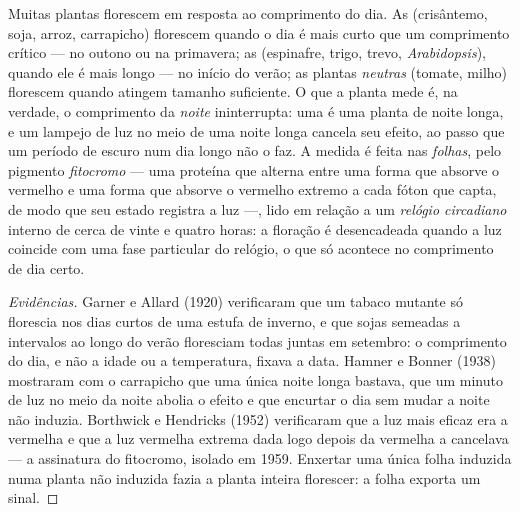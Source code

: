 \begin{proposition}\label{prop:b2:plant-flowering:photoperiod}
Muitas plantas florescem em resposta ao comprimento do dia. As
\emph{} (crisântemo, soja, arroz, carrapicho)
florescem quando o dia é mais curto que um comprimento crítico --- no
outono ou na primavera; as \emph{} (espinafre,
trigo, trevo, \emph{Arabidopsis}), quando ele é mais longo --- no início
do verão; as plantas \emph{neutras} (tomate, milho) florescem quando
atingem tamanho suficiente. O que a planta mede é, na verdade, o
comprimento da \emph{noite} ininterrupta: uma  é uma
planta de noite longa, e um lampejo de luz no meio de uma noite longa
cancela seu efeito, ao passo que um período de escuro num dia longo
não o faz. A medida é feita nas \emph{folhas}, pelo pigmento
\emph{fitocromo} --- uma proteína que alterna entre uma forma que
absorve o vermelho e uma forma que absorve o vermelho extremo a cada
fóton que capta, de modo que seu estado registra a luz ---, lido em
relação a um \emph{relógio circadiano} interno de cerca de vinte e
quatro horas: a floração é desencadeada quando a luz coincide com uma
fase particular do relógio, o que só acontece no comprimento de dia
certo.
\end{proposition}
\begin{proof}[Evidências]
Garner e Allard (1920) verificaram que um tabaco mutante só florescia
nos dias curtos de uma estufa de inverno, e que sojas semeadas a
intervalos ao longo do verão floresciam todas juntas em setembro: o
comprimento do dia, e não a idade ou a temperatura, fixava a data.
Hamner e Bonner (1938) mostraram com o carrapicho que uma única noite
longa bastava, que um minuto de luz no meio da noite abolia o efeito e
que encurtar o dia sem mudar a noite não induzia. Borthwick e Hendricks
(1952) verificaram que a luz mais eficaz era a vermelha e que a luz
vermelha extrema dada logo depois da vermelha a cancelava --- a
assinatura do fitocromo, isolado em 1959. Enxertar uma única folha
induzida numa planta não induzida fazia a planta inteira florescer: a
folha exporta um sinal.
\end{proof}

